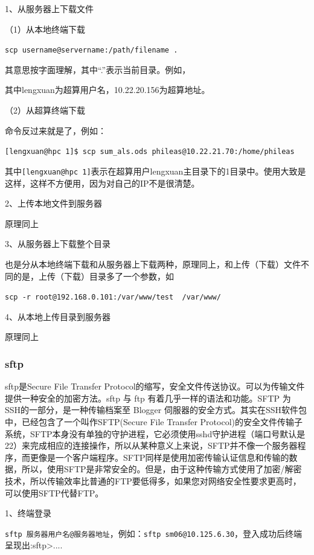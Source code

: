 {1、从服务器上下载文件

（1）从本地终端下载

\verb*|scp username@servername:/path/filename .|

其意思按字面理解，其中“.”表示当前目录。例如，
其中lengxuan为超算用户名，10.22.20.156为超算地址。


（2）从超算终端下载

命令反过来就是了，例如：

\verb*|[lengxuan@hpc 1]$ scp sum_als.ods phileas@10.22.21.70:/home/phileas|

其中\verb*|[lengxuan@hpc 1]|表示在超算用户lengxuan主目录下的1目录中。使用大致是这样，这样不方便用，因为对自己的IP不是很清楚。

2、上传本地文件到服务器

原理同上

3、从服务器上下载整个目录

也是分从本地终端下载和从服务器上下载两种，原理同上，和上传（下载）文件不同的是，上传（下载）目录多了一个参数，如

\verb*|scp -r root@192.168.0.101:/var/www/test  /var/www/  |

4、从本地上传目录到服务器

原理同上



\subsubsection{sftp}
sftp是Secure File Transfer Protocol的缩写，安全文件传送协议。可以为传输文件提供一种安全的加密方法。sftp 与 ftp 有着几乎一样的语法和功能。SFTP 为 SSH的一部分，是一种传输档案至 Blogger 伺服器的安全方式。其实在SSH软件包中，已经包含了一个叫作SFTP(Secure File Transfer Protocol)的安全文件传输子系统，SFTP本身没有单独的守护进程，它必须使用sshd守护进程（端口号默认是22）来完成相应的连接操作，所以从某种意义上来说，SFTP并不像一个服务器程序，而更像是一个客户端程序。SFTP同样是使用加密传输认证信息和传输的数据，所以，使用SFTP是非常安全的。但是，由于这种传输方式使用了加密/解密技术，所以传输效率比普通的FTP要低得多，如果您对网络安全性要求更高时，可以使用SFTP代替FTP。

1、终端登录

\verb|sftp 服务器用户名@服务器地址|，例如：\verb|sftp sm06@10.125.6.30|，登入成功后终端呈现出:sftp>....

}
